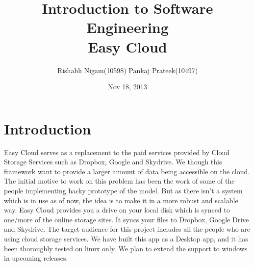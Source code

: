 \documentclass{article}
\title{Introduction to Software Engineering \\ Easy Cloud}
\author{Rishabh Nigam(10598)  Pankaj Prateek(10497)}
\date{Nov 18, 2013}
\begin{document}
\maketitle

\section{Introduction}
Easy Cloud serves as a replacement to the paid services provided by Cloud Storage Services such as Dropbox, Google and Skydrive. We though this framework want to provide a larger amount of data being accessible on the cloud. The initial motive to work on this problem has been the work of some of the people implementing hacky prototype of the model. But as there isn’t a system which is in use as of now, the idea is to make it in a more robust and scalable way. Easy Cloud provides you a drive on your local disk which is synced to one/more of the online storage sites. It syncs your files to Dropbox, Google Drive and Skydrive.  The target audience for this project includes all the people who are using cloud storage services. We have built this app as a Desktop app, and it has been thoroughly tested on linux only. We plan to extend the support to windows in upcoming releases.
\end{document}
